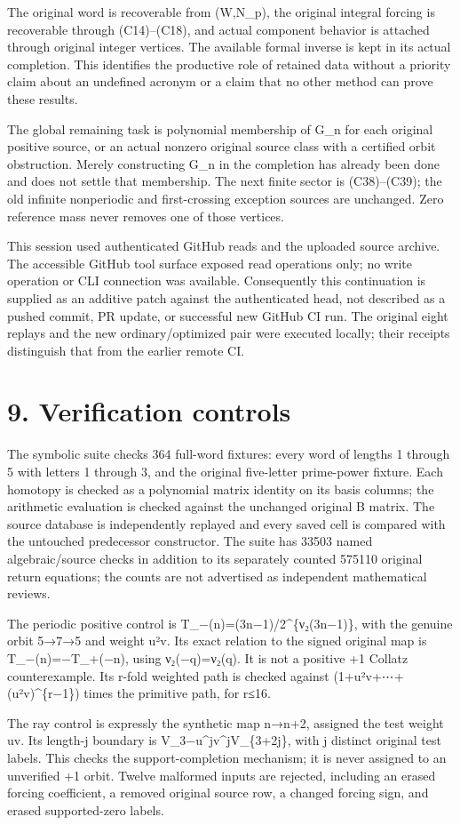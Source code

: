 The original word is recoverable from (W,N\_p), the original integral
forcing is recoverable through (C14)--(C18), and actual component
behavior is attached through original integer vertices. The available
formal inverse is kept in its actual completion. This identifies the
productive role of retained data without a priority claim about an
undefined acronym or a claim that no other method can prove these
results.

The global remaining task is polynomial membership of G\_n for each
original positive source, or an actual nonzero original source class
with a certified orbit obstruction. Merely constructing G\_n in the
completion has already been done and does not settle that membership.
The next finite sector is (C38)--(C39); the old infinite nonperiodic and
first-crossing exception sources are unchanged. Zero reference mass
never removes one of those vertices.

This session used authenticated GitHub reads and the uploaded source
archive. The accessible GitHub tool surface exposed read operations
only; no write operation or CLI connection was available. Consequently
this continuation is supplied as an additive patch against the
authenticated head, not described as a pushed commit, PR update, or
successful new GitHub CI run. The original eight replays and the new
ordinary/optimized pair were executed locally; their receipts
distinguish that from the earlier remote CI.

\section{9. Verification controls}

The symbolic suite checks 364 full-word fixtures: every word of lengths
1 through 5 with letters 1 through 3, and the original five-letter
prime-power fixture. Each homotopy is checked as a polynomial matrix
identity on its basis columns; the arithmetic evaluation is checked
against the unchanged original B matrix. The source database is
independently replayed and every saved cell is compared with the
untouched predecessor constructor. The suite has 33503 named
algebraic/source checks in addition to its separately counted 575110
original return equations; the counts are not advertised as independent
mathematical reviews.

The periodic positive control is T\_−(n)=(3n−1)/2\^{}\{ν₂(3n−1)\}, with
the genuine orbit 5→7→5 and weight u²v. Its exact relation to the signed
original map is T\_−(n)=−T\_+(−n), using ν₂(−q)=ν₂(q). It is not a
positive +1 Collatz counterexample. Its r-fold weighted path is checked
against (1+u²v+⋯+(u²v)\^{}\{r−1\}) times the primitive path, for r≤16.

The ray control is expressly the synthetic map n→n+2, assigned the test
weight uv. Its length-j boundary is V\_3−u\^{}jv\^{}jV\_\{3+2j\}, with j
distinct original test labels. This checks the support-completion
mechanism; it is never assigned to an unverified +1 orbit. Twelve
malformed inputs are rejected, including an erased forcing coefficient,
a removed original source row, a changed forcing sign, and erased
supported-zero labels.
